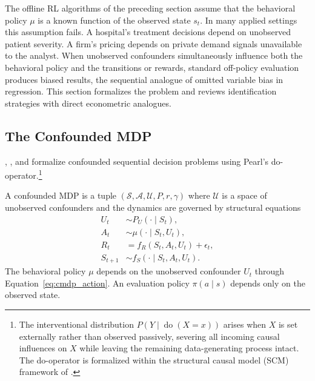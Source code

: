 
The offline RL algorithms of the preceding section assume that the behavioral policy $\mu$ is a known function of the observed state $s_t$. In many applied settings this assumption fails. A hospital's treatment decisions depend on unobserved patient severity. A firm's pricing depends on private demand signals unavailable to the analyst. When unobserved confounders simultaneously influence both the behavioral policy and the transitions or rewards, standard off-policy evaluation produces biased results, the sequential analogue of omitted variable bias in regression. This section formalizes the problem and reviews identification strategies with direct econometric analogues.

\subsection{The Confounded MDP}
\label{subsec:confounded_mdp}

\citet{zhang2019near}, \citet{zhang2020causal}, and \citet{kallus2020confounding} formalize confounded sequential decision problems using Pearl's do-operator.\footnote{The interventional distribution $P(Y \mid \operatorname{do}(X = x))$ arises when $X$ is set externally rather than observed passively, severing all incoming causal influences on $X$ while leaving the remaining data-generating process intact. The do-operator is formalized within the structural causal model (SCM) framework of \citet{pearl2009causality}.}

\begin{definition}
\label{def:confounded_mdp}
A confounded MDP is a tuple $(\mathcal{S}, \mathcal{A}, \mathcal{U}, P, r, \gamma)$ where $\mathcal{U}$ is a space of unobserved confounders and the dynamics are governed by structural equations
\begin{align}
U_t &\sim P_U(\cdot \mid S_t), \label{eq:cmdp_confounder} \\
A_t &\sim \mu(\cdot \mid S_t, U_t), \label{eq:cmdp_action} \\
R_t &= f_R(S_t, A_t, U_t) + \epsilon_t, \label{eq:cmdp_reward} \\
S_{t+1} &\sim f_S(\cdot \mid S_t, A_t, U_t). \label{eq:cmdp_transition}
\end{align}
The behavioral policy $\mu$ depends on the unobserved confounder $U_t$ through Equation~\eqref{eq:cmdp_action}. An evaluation policy $\pi(a \mid s)$ depends only on the observed state.
\end{definition}

